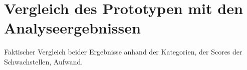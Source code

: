 \section{Vergleich des Prototypen mit den Analyseergebnissen}
\label{sec:comparison}
    Faktischer Vergleich beider Ergebnisse anhand der Kategorien, der Scores der Schwachstellen, Aufwand.
    
